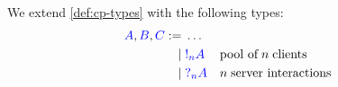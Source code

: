 \begin{definition}[Types]\label{def:nc-types}
  We extend \cref{def:cp-types} with the following types:
  \[\!
    \begin{aligned}
      \ty{A}, \ty{B}, \ty{C}
           :=& \; \dots
      \\ \mid& \; \ty{\take[n]{A}} &&\text{pool of} \; n \; \text{clients}
      \\ \mid& \; \ty{\give[n]{A}} &&n \; \text{server interactions}
    \end{aligned}
  \]  
\end{definition}
